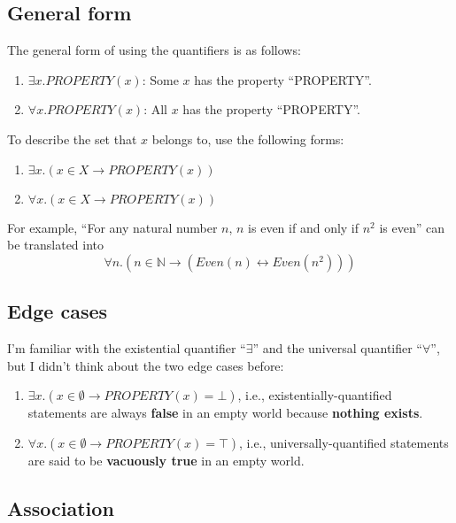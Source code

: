 \documentclass[12pt, letterpaper, oneside]{book}
\begin{document}
\subsection{General form}

The general form of using the quantifiers is as follows:
\begin{enumerate}
  \item $\exists x. PROPERTY(x)$: Some $x$ has the property ``PROPERTY''.
  \item $\forall x. PROPERTY(x)$: All $x$ has the property ``PROPERTY''.
\end{enumerate}

To describe the set that $x$ belongs to, use the following forms:
\begin{enumerate}
  \item $\exists x. (x \in X \rightarrow PROPERTY(x))$
  \item $\forall x. (x \in X \rightarrow PROPERTY(x))$
\end{enumerate}

For example, ``For any natural number $n$, $n$ is even if and only if $n^2$ is
even'' can be translated into
\[
  \forall n. (n \in \mathbb{N} \rightarrow (Even(n) \leftrightarrow Even(n^2)))
\]

\subsection{Edge cases}

I'm familiar with the existential quantifier ``$\exists$'' and the universal
quantifier ``$\forall$'', but I didn't think about the two edge cases before:
\begin{enumerate}
  \item $\exists x. (x \in \emptyset \rightarrow PROPERTY(x) = \bot)$, i.e.,
        existentially-quantified statements are always \textbf{false} in an empty
        world because \textbf{nothing exists}.
  \item $\forall x. (x \in \emptyset \rightarrow PROPERTY(x) = \top)$, i.e.,
        universally-quantified statements are said to be \textbf{vacuously true} in
        an empty world.
\end{enumerate}

\subsection{Association}
\end{document}

